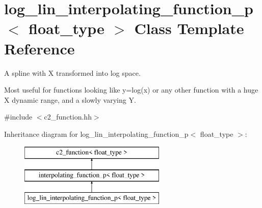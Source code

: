 \hypertarget{classlog__lin__interpolating__function__p}{\section{log\-\_\-lin\-\_\-interpolating\-\_\-function\-\_\-p$<$ float\-\_\-type $>$ Class Template Reference}
\label{classlog__lin__interpolating__function__p}
}


A spline with X transformed into log space.

Most useful for functions looking like y=log(x) or any other function with a huge X dynamic range, and a slowly varying Y.  




{\ttfamily \#include $<$c2\-\_\-function.\-hh$>$}

Inheritance diagram for log\-\_\-lin\-\_\-interpolating\-\_\-function\-\_\-p$<$ float\-\_\-type $>$\-:\begin{figure}[H]
\begin{center}
\leavevmode
\includegraphics[height=3.000000cm]{classlog__lin__interpolating__function__p}
\end{center}
\end{figure}
